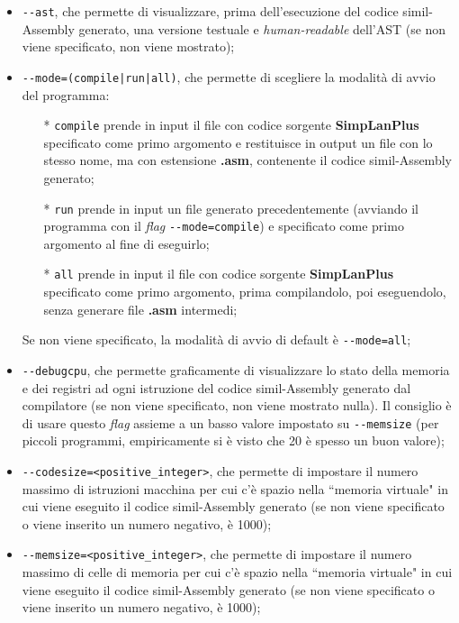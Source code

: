 \documentclass[../report.tex]{subfiles}
\begin{document}
\begin{itemize}
    \item \verb|--ast|, che permette di visualizzare, prima dell'esecuzione del codice simil-Assembly generato, una versione testuale e \textit{human-readable} dell'AST (se non viene specificato, non viene mostrato);
    \item \verb/--mode=(compile|run|all)/, che permette di scegliere la modalità di avvio del programma:
    \begin{itemize}
        \item[*] \verb|compile| prende in input il file con codice sorgente \textbf{SimpLanPlus} specificato come primo argomento e restituisce in output un file con lo stesso nome, ma con estensione \textbf{.asm}, contenente il codice simil-Assembly generato;
        \item[*] \verb|run| prende in input un file generato precedentemente (avviando il programma con il \textit{flag} \verb|--mode=compile|) e specificato come primo argomento al fine di eseguirlo;
        \item[*] \verb|all| prende in input il file con codice sorgente \textbf{SimpLanPlus} specificato come primo argomento, prima compilandolo, poi eseguendolo, senza generare file \textbf{.asm} intermedi;
    \end{itemize}
    Se non viene specificato, la modalità di avvio di default è \verb|--mode=all|;
    \item \verb|--debugcpu|, che permette graficamente di visualizzare lo stato della memoria e dei registri ad ogni istruzione del codice simil-Assembly generato dal compilatore (se non viene specificato, non viene mostrato nulla). Il consiglio è di usare questo \textit{flag} assieme a un basso valore impostato su \verb|--memsize| (per piccoli programmi, empiricamente si è visto che 20 è spesso un buon valore);
    \item \verb|--codesize=<positive_integer>|, che permette di impostare il numero massimo di istruzioni macchina per cui c'è spazio nella ``memoria virtuale" in cui viene eseguito il codice simil-Assembly generato (se non viene specificato o viene inserito un numero negativo, è 1000);
    \item \verb|--memsize=<positive_integer>|, che permette di impostare il numero massimo di celle di memoria per cui c'è spazio nella ``memoria virtuale" in cui viene eseguito il codice simil-Assembly generato (se non viene specificato o viene inserito un numero negativo, è 1000);
\end{itemize}
\end{document}
